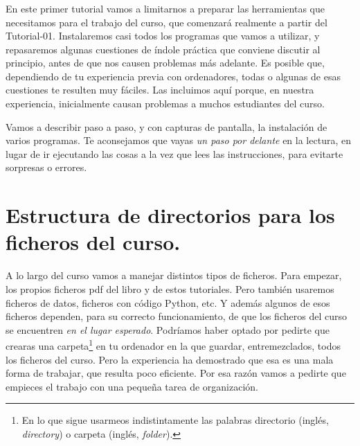 \documentclass[10pt,a4paper]{article}\usepackage[]{graphicx}\usepackage[]{color}
\begin{document}
\subsubsection*{}

En este primer tutorial vamos a limitarnos a preparar las herramientas que necesitamos para el
trabajo del curso, que comenzará realmente a partir del Tutorial-01. Instalaremos casi todos los
programas que vamos a utilizar, y repasaremos algunas cuestiones de índole práctica que conviene
discutir al principio, antes de que nos causen problemas más adelante. Es posible que, dependiendo
de tu experiencia previa con ordenadores, todas o algunas de esas cuestiones te resulten muy
fáciles. Las incluimos aquí porque, en nuestra experiencia, inicialmente causan problemas a muchos
estudiantes del curso.

Vamos a describir paso a paso, y con capturas de pantalla, la instalación de varios programas. Te
aconsejamos que vayas {\em un paso por delante} en la lectura, en lugar de ir ejecutando las cosas
a la vez que lees las instrucciones, para evitarte sorpresas o errores.


\section*{Estructura de directorios para los ficheros del curso.}
\label{tut00:sec:estructuraFicherosCurso}


A lo largo del curso vamos a manejar distintos tipos de ficheros. Para empezar, los propios ficheros pdf del libro y de estos tutoriales. Pero también usaremos ficheros de datos, ficheros con código Python,  etc. Y además algunos de esos ficheros dependen, para su correcto funcionamiento, de que los ficheros del curso se encuentren {\em en el lugar esperado}. Podríamos haber optado por pedirte que crearas una carpeta\footnote{En lo que sigue usarmeos indistintamente las palabras {\sf directorio} (inglés, {\em directory}) o {\sf carpeta} (inglés, {\em folder}).} en tu ordenador en la que guardar, entremezclados, todos los ficheros del curso. Pero la experiencia ha demostrado que esa es una mala forma de trabajar, que resulta poco eficiente. Por esa razón vamos a pedirte que empieces el trabajo con una pequeña tarea de organización. 
\end{document}
